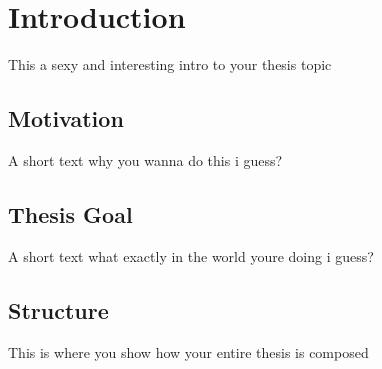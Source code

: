 \documentclass{../Main/main.tex}{subfiles}
\begin{document}
\chapter{Introduction}

This a sexy and interesting intro to your thesis topic

\section{Motivation}

A short text why you wanna do this i guess?

\section{Thesis Goal}

A short text what exactly in the world youre doing i guess?

\section{Structure}

This is where you show how your entire thesis is composed
\end{document}
